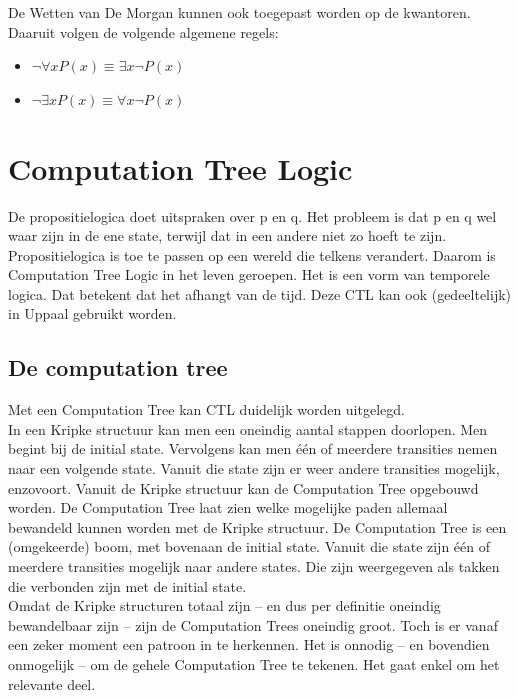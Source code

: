 \documentclass{article}
\begin{document}
		De Wetten van De Morgan kunnen ook toegepast worden op de kwantoren. Daaruit volgen de volgende algemene regels:

		\begin{itemize}
			\item \( \neg \forall xP(x) \equiv \exists x \neg P(x) \)
			\item \( \neg \exists xP(x) \equiv \forall x \neg P(x) \)
		\end{itemize}
	
	\newpage
	
	
	\section{Computation Tree Logic}
	
	De propositielogica doet uitspraken over p en q. Het probleem is dat p en q wel waar zijn in de ene state, terwijl dat in een andere niet zo hoeft te zijn. Propositielogica is toe te passen op een wereld die telkens verandert. Daarom is Computation Tree Logic in het leven geroepen. Het is een vorm van temporele logica. Dat betekent dat het afhangt van de tijd. Deze CTL kan ook (gedeeltelijk) in Uppaal gebruikt worden.
		
		\subsection{De computation tree}
		
		Met een Computation Tree kan CTL duidelijk worden uitgelegd. \\
		In een Kripke structuur kan men een oneindig aantal stappen doorlopen. Men begint bij de initial state. Vervolgens kan men één of meerdere transities nemen naar een volgende state. Vanuit die state zijn er weer andere transities mogelijk, enzovoort. Vanuit de Kripke structuur kan de Computation Tree opgebouwd worden. De Computation Tree laat zien welke mogelijke paden allemaal bewandeld kunnen worden met de Kripke structuur. De Computation Tree is een (omgekeerde) boom, met bovenaan de initial state. Vanuit die state zijn één of meerdere transities mogelijk naar andere states. Die zijn weergegeven als takken die verbonden zijn met de initial state. \\		
		Omdat de Kripke structuren totaal zijn -- en dus per definitie oneindig bewandelbaar zijn -- zijn de Computation Trees oneindig groot. Toch is er vanaf een zeker moment een patroon in te herkennen. Het is onnodig -- en bovendien onmogelijk -- om de gehele Computation Tree te tekenen. Het gaat enkel om het relevante deel.
\end{document}

